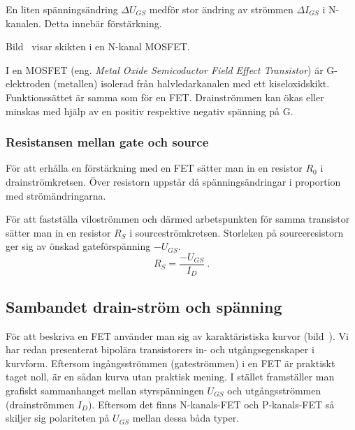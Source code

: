 En liten spänningsändring \(\Delta U_{GS}\) medför stor ändring av strömmen
\(\Delta I_{GS}\) i N-kanalen. Detta innebär förstärkning.



Bild~ visar skikten i en N-kanal MOSFET.

I en MOSFET (eng. \emph{Metal Oxide Semicoductor Field Effect Transistor}) är
G-elektroden (metallen) isolerad från halvledarkanalen med ett kiseloxidskikt.
Funktionssättet är samma som för en FET.
Drainströmmen kan ökas eller minskas med hjälp av en positiv respektive negativ
spänning på G.

\subsubsection{Resistansen mellan gate och source}

För att erhålla en förstärkning med en FET sätter man in en resistor \(R_0\) i
drainströmkretsen.
Över resistorn uppstår då spänningsändringar i proportion med strömändringarna.

För att fastställa viloströmmen och därmed arbetspunkten för samma transistor
sätter man in en resistor \(R_S\) i sourceströmkretsen.
Storleken på sourceresistorn ger sig av önskad gateförspänning \(-U_{GS}\).
\[R_S = \dfrac{-U_{GS}}{I_D}~.\]


\subsection{Sambandet drain-ström och spänning}

För att beskriva en FET använder man sig av karaktäristiska kurvor
(bild~).
Vi har redan presenterat bipolära transistorers in- och utgångsegenskaper i kurvform.
Eftersom ingångsströmmen (gateströmmen) i en FET är praktiskt taget noll, är en
sådan kurva utan praktisk mening.
I stället framställer man grafiskt sammanhanget mellan styrspänningen \(U_{GS}\)
och utgångsströmmen (drainströmmen \(I_D\)).
Eftersom det finns N-kanals-FET och P-kanals-FET så skiljer sig polariteten på
\(U_{GS}\) mellan dessa båda typer.
